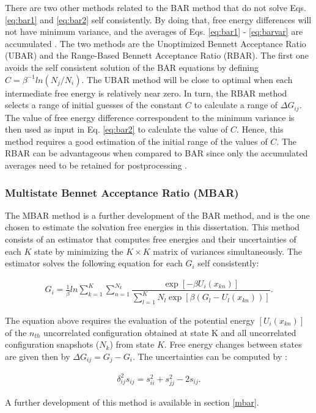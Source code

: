 There are two other methods related to the BAR method that do not solve Eqs. \eqref{eq:bar1} and \eqref{eq:bar2} self consistently. By doing that, free energy differences will not have minimum variance, and the averages of Eqs. \eqref{eq:bar1} - \eqref{eq:barvar} are accumulated \cite{bareva}. The two methods are the Unoptimized Bennett Acceptance Ratio (UBAR) and the Range-Based Bennett Acceptance Ratio (RBAR). The first one avoids the self consistent solution of the BAR equations by defining $C=\beta^{-1}ln(N_{j}/N_{i})$. The UBAR method will be close to optimal when each intermediate free energy is relatively near zero. In turn, the RBAR method selects a range of initial guesses of the constant $C$ to calculate a range of $\Delta G_{ij}$. The value of free energy difference correspondent to the minimum variance is then used as input in Eq. \eqref{eq:bar2} to calculate the value of $C$. Hence, this method requires a good estimation of the initial range of the values of $C$. The RBAR can be advantageous when compared to BAR since only the accumulated averages need to be retained for postprocessing \cite{bareva}.  

\subsubsection{Multistate Bennet Acceptance Ratio (MBAR)}

The MBAR method \cite{mbar} is a further development of the BAR method, and is the one chosen to estimate the solvation free energies in this dissertation. This method consists of an estimator that computes free energies and their uncertainties of each $K$ state by minimizing the $K \times K$ matrix of variances simultaneously. The estimator solves the following equation for each $G_{i}$ self consistently:


\begin{equation}
\label{eq:mbar}
\begin{aligned}
G_{i} = \frac{1}{\beta}ln \sum_{k=1}^{K} \sum_{n=1}^{N_{k}}
\dfrac{\exp[-\beta U_{i}(x_{kn})]}{\sum_{l=1}^{K} N_{l} \exp[\beta (G_{l} - U_{l}(x_{kn}))]} .
\end{aligned}
\end{equation}

The equation above requires the evaluation of the potential energy $[U_{i}(x_{kn})]$ of  the $n_{th}$ uncorrelated configuration obtained at state K and  all uncorrelated configuration snapshots ($N_{k}$) from state $K$. Free energy changes between states are given then by $\Delta G_{ij} = G_{j} -  G_{i}$. The uncertainties  can be computed by :

\begin{equation}
\begin{aligned}
\delta _{ij}^{2} s_{ij} = s_{ii}^{2} + s_{jj}^{2} - 2 s_{ij}.
\end{aligned}
\end{equation}

A further development of this method is available in section \ref{mbar}.

